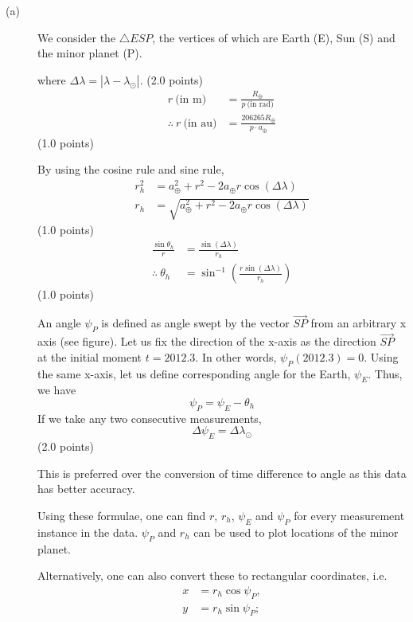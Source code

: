 \begin{description}
\item[(a)] We consider the $\triangle ESP$, the vertices of which are Earth
  (E), Sun (S) and the minor planet (P).


  where $\Delta\lambda = |\lambda - \lambda_\odot|$. \hfill(2.0 points)
  \begin{align*}
    r\ \text{(in m)} &= \frac{R_\oplus}{p\ \text{(in rad)}} \\
    \therefore\ r\ \text{(in au)} &= \frac{206265 R_\oplus}{p\cdot a_\oplus}
  \end{align*}
  \hfill(1.0 points)

  By using the cosine rule and sine rule,
  \begin{align*}
    r_h^2 &= a_\oplus^2 + r^2 - 2a_\oplus r\cos(\Delta\lambda) \\
    r_h &= \sqrt{a_\oplus^2 + r^2 - 2a_\oplus r\cos(\Delta\lambda)}
  \end{align*}
  \hfill(1.0 points)
  \begin{align*}
    \frac{\sin\theta_h}{r} &= \frac{\sin(\Delta\lambda)}{r_h} \\
    \therefore\ \theta_h &=
      \sin^{-1}\left(\frac{r\sin(\Delta\lambda)}{r_h}\right)
  \end{align*}
  \hfill(1.0 points)

  An angle $\psi_P$ is defined as angle swept by the vector
  $\overrightarrow{SP}$ from an arbitrary x axis (see figure). Let us fix the
  direction of the x-axis as the direction $\overrightarrow{SP}$ at the
  initial moment $t = 2012.3$. In other words, $\psi_P(2012.3) = 0$. Using the
  same x-axis, let us define corresponding angle for the Earth,
  $\psi_E$. Thus, we have
  \[
    \psi_P = \psi_E - \theta_h
  \]
  If we take any two consecutive measurements,
  \[
    \Delta\psi_E = \Delta\lambda_\odot
  \]
  \hfill(2.0 points)

  This is preferred over the conversion of time difference to angle as this
  data has better accuracy.

  Using these formulae, one can find $r$, $r_h$, $\psi_E$ and $\psi_P$ for
  every measurement instance in the data. $\psi_P$ and $r_h$ can be used to
  plot locations of the minor planet.

  Alternatively, one can also convert these to rectangular coordinates, i.e.
  \begin{align*}
    x &= r_h\cos\psi_P, \\
    y &= r_h\sin\psi_P;
  \end{align*}


\end{description}
